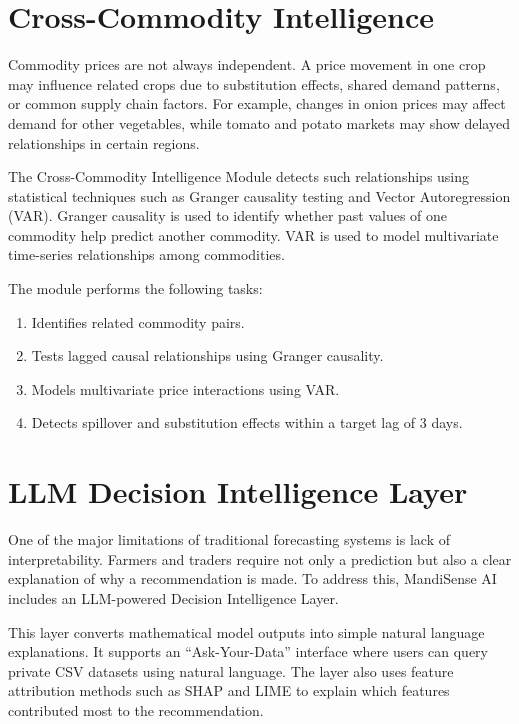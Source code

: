 \documentclass[12pt,a4paper]{report}
\begin{document}
\section{Cross-Commodity Intelligence}

Commodity prices are not always independent. A price movement in one crop may influence related crops due to substitution effects, shared demand patterns, or common supply chain factors. For example, changes in onion prices may affect demand for other vegetables, while tomato and potato markets may show delayed relationships in certain regions.

The Cross-Commodity Intelligence Module detects such relationships using statistical techniques such as Granger causality testing and Vector Autoregression (VAR). Granger causality is used to identify whether past values of one commodity help predict another commodity. VAR is used to model multivariate time-series relationships among commodities.

The module performs the following tasks:

\begin{enumerate}
    \item Identifies related commodity pairs.
    \item Tests lagged causal relationships using Granger causality.
    \item Models multivariate price interactions using VAR.
    \item Detects spillover and substitution effects within a target lag of 3 days.
\end{enumerate}

\section{LLM Decision Intelligence Layer}

One of the major limitations of traditional forecasting systems is lack of interpretability. Farmers and traders require not only a prediction but also a clear explanation of why a recommendation is made. To address this, MandiSense AI includes an LLM-powered Decision Intelligence Layer.

This layer converts mathematical model outputs into simple natural language explanations. It supports an ``Ask-Your-Data'' interface where users can query private CSV datasets using natural language. The layer also uses feature attribution methods such as SHAP and LIME to explain which features contributed most to the recommendation.
\end{document}
